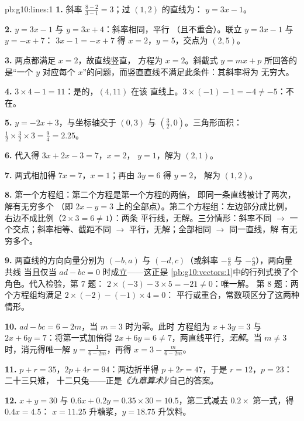 \begin{solution}{pb:g10:lines:1}
\textbf{1.} 斜率 $\frac{8 - 2}{3 - 1} = 3$；过 $(1, 2)$ 的直线为：
$y = 3x - 1$。

\textbf{2.} $y = 3x - 1$ 与 $y = 3x + 4$：斜率相同，平行
（且不重合）。联立 $y = 3x - 1$ 与 $y = -x + 7$：
$3x - 1 = -x + 7$ 得 $x = 2$，$y = 5$，交点为 $(2, 5)$。

\textbf{3.} 两点都满足 $x = 2$，故直线竖直，
方程为 $x = 2$。斜截式 $y = mx + p$ 所回答的是“一个 $y$
对应每个 $x$”的问题，而竖直直线不满足此条件：其斜率将为
无穷大。

\textbf{4.} $3 \times 4 - 1 = 11$：是的，$(4, 11)$ 在该
直线上。$3 \times (-1) - 1 = -4 \neq -5$：不在。

\textbf{5.} $y = -2x + 3$，与坐标轴交于 $(0, 3)$ 与
$\left(\frac32, 0\right)$。三角形面积：
$\frac12 \times \frac32 \times 3 = \frac94 = 2.25$。

\textbf{6.} 代入得 $3x + 2x - 3 = 7$，$x = 2$，
$y = 1$，解为 $(2, 1)$。

\textbf{7.} 两式相加得 $7x = 7$，$x = 1$；再由 $3y = 6$ 得 $y = 2$，
解为 $(1, 2)$。

\textbf{8.} 第一个方程组：第二个方程是第一个方程的两倍，
即同一条直线被计了两次，解有无穷多个
（即 $2x - y = 3$ 上的全部点）。第二个方程组：左边部分成比例，
右边不成比例（$2 \times 3 = 6 \neq 1$）：两条
平行线，无解。三分情形：斜率不同
$\to$ 一个交点；斜率相等、截距不同 $\to$
平行，无解；全部相同 $\to$ 同一直线，解
有无穷多个。

\textbf{9.} 两直线的方向向量分别为 $(-b, a)$ 与
$(-d, c)$（或斜率 $-\frac ab$ 与 $-\frac cd$），两向量共线
当且仅当 $ad - bc = 0$ 时成立——这正是
\cref{pb:g10:vectors:1}中的行列式换了个角色。代入检验，第 7 题：
$2 \times (-3) - 3 \times 5 = -21 \neq 0$：唯一解。
第 8 题：两个方程组均满足 $2 \times (-2) - (-1) \times 4 = 0$：
平行或重合，常数项区分了这两种
情形。

\textbf{10.} $ad - bc = 6 - 2m$，当 $m = 3$ 时为零。此时
方程组为 $x + 3y = 3$ 与 $2x + 6y = 7$：将第一式加倍得
$2x + 6y = 6 \neq 7$，两直线平行，\emph{无解}。当
$m \neq 3$ 时，消元得唯一解
$y = \frac{1}{6 - 2m}$，再得 $x = 3 - \frac{m}{6 - 2m}$。

\textbf{11.} $p + r = 35$，$2p + 4r = 94$：两边折半得
$p + 2r = 47$，于是 $r = 12$，$p = 23$：二十三只雉，
十二只兔——正是\emph{《九章算术》}'自己的答案。

\textbf{12.} $x + y = 30$ 与 $0.6x + 0.2y = 0.35 \times 30 =
10.5$，第二式减去 $0.2 \times$ 第一式，得 $0.4x = 4.5$：
$x = 11.25$ 升糖浆，$y = 18.75$ 升饮料。


\end{solution}
